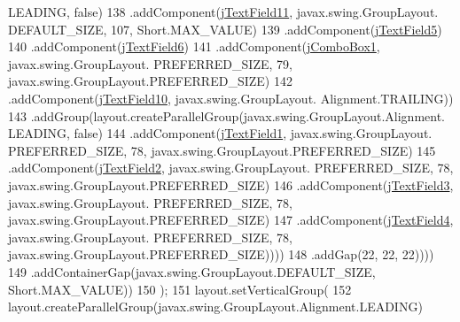 \begin{DoxyCode}
      LEADING, \textcolor{keyword}{false})
138                                         .addComponent(\mbox{\hyperlink{class_interfaz_package_1_1_alta_libro_lectura_a0de30e644010e7a1c4aab54936597f18}{jTextField11}}, javax.swing.GroupLayout.
      DEFAULT\_SIZE, 107, Short.MAX\_VALUE)
139                                         .addComponent(\mbox{\hyperlink{class_interfaz_package_1_1_alta_libro_lectura_a9780c336f84357f6c171a8ccd8f8a94b}{jTextField5}})
140                                         .addComponent(\mbox{\hyperlink{class_interfaz_package_1_1_alta_libro_lectura_a064748cc16381a3773e64995629181b2}{jTextField6}})
141                                         .addComponent(\mbox{\hyperlink{class_interfaz_package_1_1_alta_libro_lectura_ac1e5e88822746a9f922ab99cab5fd21b}{jComboBox1}}, javax.swing.GroupLayout.
      PREFERRED\_SIZE, 79, javax.swing.GroupLayout.PREFERRED\_SIZE)
142                                         .addComponent(\mbox{\hyperlink{class_interfaz_package_1_1_alta_libro_lectura_a937dab20a07279280f73c9b235398043}{jTextField10}}, javax.swing.GroupLayout.
      Alignment.TRAILING))
143                                     .addGroup(layout.createParallelGroup(javax.swing.GroupLayout.Alignment.
      LEADING, \textcolor{keyword}{false})
144                                         .addComponent(\mbox{\hyperlink{class_interfaz_package_1_1_alta_libro_lectura_aa23404c288ffab1e9e7e349e4336cc20}{jTextField1}}, javax.swing.GroupLayout.
      PREFERRED\_SIZE, 78, javax.swing.GroupLayout.PREFERRED\_SIZE)
145                                         .addComponent(\mbox{\hyperlink{class_interfaz_package_1_1_alta_libro_lectura_a27642fe481c01e307cab4843cc5d86b8}{jTextField2}}, javax.swing.GroupLayout.
      PREFERRED\_SIZE, 78, javax.swing.GroupLayout.PREFERRED\_SIZE)
146                                         .addComponent(\mbox{\hyperlink{class_interfaz_package_1_1_alta_libro_lectura_a51e44050eaeb982b64b831c47c61302f}{jTextField3}}, javax.swing.GroupLayout.
      PREFERRED\_SIZE, 78, javax.swing.GroupLayout.PREFERRED\_SIZE)
147                                         .addComponent(\mbox{\hyperlink{class_interfaz_package_1_1_alta_libro_lectura_a9270f2ef1de5103cae58610ae6f84a4e}{jTextField4}}, javax.swing.GroupLayout.
      PREFERRED\_SIZE, 78, javax.swing.GroupLayout.PREFERRED\_SIZE))))
148                             .addGap(22, 22, 22))))
149                 .addContainerGap(javax.swing.GroupLayout.DEFAULT\_SIZE, Short.MAX\_VALUE))
150         );
151         layout.setVerticalGroup(
152             layout.createParallelGroup(javax.swing.GroupLayout.Alignment.LEADING)

\end{DoxyCode}
